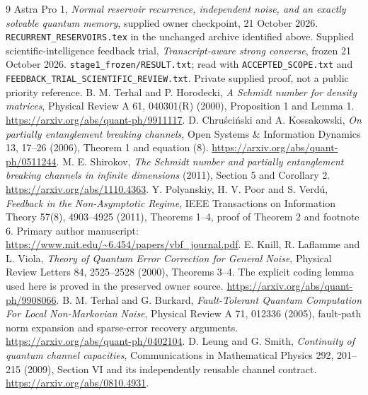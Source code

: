 \documentclass[11pt]{article}
\begin{document}
\begin{thebibliography}{9}\small
{} Astra Pro 1, \emph{Normal reservoir recurrence, independent noise, and an exactly solvable quantum memory}, supplied owner checkpoint, 21 October 2026. \texttt{RECURRENT\_RESERVOIRS.tex} in the unchanged archive identified above.
 Supplied scientific-intelligence feedback trial, \emph{Transcript-aware strong converse}, frozen 21 October 2026. \texttt{stage1\_frozen/RESULT.txt}; read with \texttt{ACCEPTED\_SCOPE.txt} and \texttt{FEEDBACK\_TRIAL\_SCIENTIFIC\_REVIEW.txt}. Private supplied proof, not a public priority reference.
 B. M. Terhal and P. Horodecki, \emph{A Schmidt number for density matrices}, Physical Review A 61, 040301(R) (2000), Proposition 1 and Lemma 1. \url{https://arxiv.org/abs/quant-ph/9911117}.
 D. Chru\'sci\'nski and A. Kossakowski, \emph{On partially entanglement breaking channels}, Open Systems \& Information Dynamics 13, 17--26 (2006), Theorem 1 and equation (8). \url{https://arxiv.org/abs/quant-ph/0511244}.
 M. E. Shirokov, \emph{The Schmidt number and partially entanglement breaking channels in infinite dimensions} (2011), Section 5 and Corollary 2. \url{https://arxiv.org/abs/1110.4363}.
 Y. Polyanskiy, H. V. Poor and S. Verd\'u, \emph{Feedback in the Non-Asymptotic Regime}, IEEE Transactions on Information Theory 57(8), 4903--4925 (2011), Theorems 1--4, proof of Theorem 2 and footnote 6. Primary author manuscript: \url{https://www.mit.edu/~6.454/papers/vbf_journal.pdf}.
 E. Knill, R. Laflamme and L. Viola, \emph{Theory of Quantum Error Correction for General Noise}, Physical Review Letters 84, 2525--2528 (2000), Theorems 3--4. The explicit coding lemma used here is proved in the preserved owner source. \url{https://arxiv.org/abs/quant-ph/9908066}.
 B. M. Terhal and G. Burkard, \emph{Fault-Tolerant Quantum Computation For Local Non-Markovian Noise}, Physical Review A 71, 012336 (2005), fault-path norm expansion and sparse-error recovery arguments. \url{https://arxiv.org/abs/quant-ph/0402104}.
 D. Leung and G. Smith, \emph{Continuity of quantum channel capacities}, Communications in Mathematical Physics 292, 201--215 (2009), Section VI and its independently reusable channel contract. \url{https://arxiv.org/abs/0810.4931}.
\end{thebibliography}
\end{document}
